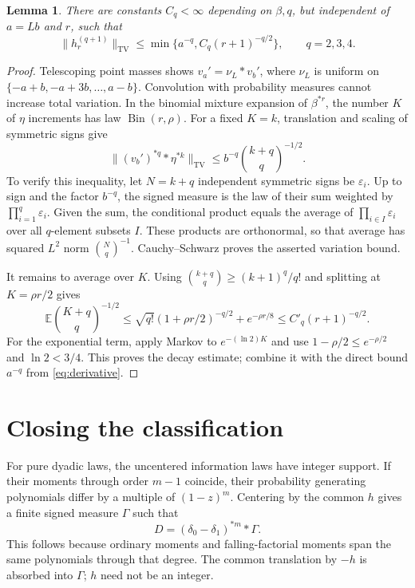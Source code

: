 \documentclass[11pt,a4paper]{article}
\newtheorem{lemma}[theorem]{Lemma}
\newcommand{\E}{\mathbb E}
\newcommand{\TV}{\mathrm{TV}}
\begin{document}
\begin{lemma}\label{lem:decay}
There are constants $C_q<\infty$ depending on $\beta,q$, but independent
of $a=Lb$ and $r$, such that
\begin{equation}\label{eq:decay}
\|h_r^{(q+1)}\|_{\TV}
\le\min\{a^{-q},C_q(r+1)^{-q/2}\},\qquad q=2,3,4.
\end{equation}
\end{lemma}
\begin{proof}
Telescoping point masses shows
$v_a'=\nu_L*v_b'$, where $\nu_L$ is uniform on
$\{-a+b,-a+3b,\ldots,a-b\}$.
Convolution with probability measures cannot increase total variation.
In the binomial mixture expansion of $\beta^{*r}$, the number $K$ of
$\eta$ increments has law $\operatorname{Bin}(r,\rho)$.
For a fixed $K=k$, translation and scaling of symmetric signs give
\[
\|(v_b')^{*q}*\eta^{*k}\|_{\TV}
\le b^{-q}\binom{k+q}{q}^{-1/2}.
\]
To verify this inequality, let $N=k+q$ independent symmetric signs be
$\varepsilon_i$. Up to sign and the factor $b^{-q}$, the signed measure
is the law of their sum weighted by $\prod_{i=1}^q\varepsilon_i$.
Given the sum, the conditional product equals the average of
$\prod_{i\in I}\varepsilon_i$ over all $q$-element subsets $I$.
These products are orthonormal, so that average has squared $L^2$ norm
$\binom Nq^{-1}$. Cauchy--Schwarz proves the asserted variation bound.

It remains to average over $K$. Using
$\binom{k+q}{q}\ge(k+1)^q/q!$ and splitting at $K=\rho r/2$ gives
\[
\E\binom{K+q}{q}^{-1/2}
\le\sqrt{q!}(1+\rho r/2)^{-q/2}+e^{-\rho r/8}
\le C'_q(r+1)^{-q/2}.
\]
For the exponential term, apply Markov to $e^{-(\ln2)K}$ and use
$1-\rho/2\le e^{-\rho/2}$ and $\ln2<3/4$.
This proves the decay estimate; combine it with the direct bound
$a^{-q}$ from \eqref{eq:derivative}.
\end{proof}

\section{Closing the classification}
For pure dyadic laws, the uncentered information laws have integer
support. If their moments through order $m-1$ coincide, their probability
generating polynomials differ by a multiple of $(1-z)^m$.
Centering by the common $h$ gives a finite signed measure $\Gamma$ such
that
\begin{equation}\label{eq:factor}
D=(\delta_0-\delta_1)^{*m}*\Gamma.
\end{equation}
This follows because ordinary moments and falling-factorial moments
span the same polynomials through that degree. The common translation
by $-h$ is absorbed into $\Gamma$; $h$ need not be an integer.
\end{document}
